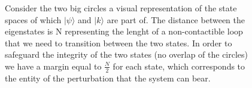 \documentclass{Configuration_Files/PoliMi3i_thesis}
\begin{document}
\begin{figure}
	\begin{center}
		
		
	\end{center}
	\caption{Consider the two big circles a visual representation of the state spaces of which $|\psi\rangle$ and $|k\rangle$ are part of. The distance between the eigenstates is N representing the lenght of a non-contactible loop that we need to transition between the two states. In order to safeguard the integrity of the two states (no overlap of the circles) we have a margin equal to $\frac{N}{2}$ for each state, which corresponds to the entity of the perturbation that the system can bear. }
	\label{fig:QEC}
\end{figure}
\end{document}
